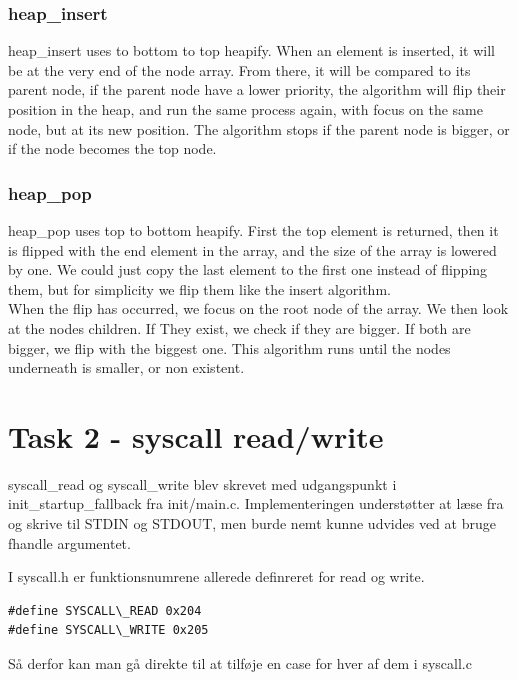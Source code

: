 \documentclass[11pt]{article}
\begin{document}
\subsubsection*{heap\_insert}
heap\_insert uses to bottom to top heapify. When an element is inserted, it will be at the very end of the node array. From there, it will be compared to its parent node, if the parent node have a lower priority, the algorithm will flip their 
position in the heap, and run the same process again, with focus on the same node, but at its new position. The algorithm stops if the parent node is bigger, or if the node becomes the top node.
\subsubsection*{heap\_pop}
heap\_pop uses top to bottom heapify. First the top element is returned, then it is flipped with the end element in the array, and the size of the array is lowered by one. We could just copy the last element to the first one instead of flipping them, but for simplicity we flip them like the insert algorithm.\\
When the flip has occurred, we focus on the root node of the array. We then look
at the nodes children. If They exist, we check if they are bigger. If both are bigger, we flip with the biggest one. This algorithm runs until the nodes underneath is smaller, or non existent.



\section*{Task 2 - syscall read/write}

syscall\_read og syscall\_write blev skrevet med udgangspunkt i init\_startup\_fallback fra init/main.c. Implementeringen understøtter at læse fra og skrive til STDIN og STDOUT, men burde nemt kunne udvides ved at bruge fhandle argumentet.

I syscall.h er funktionsnumrene allerede definreret for read og write.
\begin{lstlisting}[style=customc]
#define SYSCALL\_READ 0x204
#define SYSCALL\_WRITE 0x205
\end{lstlisting}

Så derfor kan man gå direkte til at tilføje en case for hver af dem i syscall.c
\end{document}
